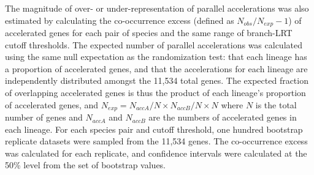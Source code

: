 The magnitude of over- or under-representation of parallel
accelerations was also estimated by calculating the co-occurrence
excess (defined as $N_{obs}/N_{exp} - 1$) of accelerated genes for
each pair of species and the same range of branch-LRT cutoff
thresholds. The expected number of parallel accelerations was
calculated using the same null expectation as the randomization test:
that each lineage has a proportion of accelerated genes, and that the
accelerations for each lineage are independently distributed amongst
the 11,534 total genes. The expected fraction of overlapping
accelerated genes is thus the product of each lineage's proportion of
accelerated genes, and $N_{exp}=N_{accA}/N\times N_{accB}/N\times N$
where $N$ is the total number of genes and $N_{accA}$ and $N_{accB}$
are the numbers of accelerated genes in each lineage. For each species
pair and cutoff threshold, one hundred bootstrap replicate datasets
were sampled from the 11,534 genes. The co-occurrence excess was
calculated for each replicate, and confidence intervals were
calculated at the 50\% level from the set of bootstrap values.

